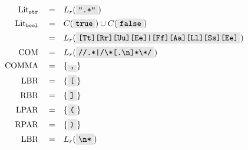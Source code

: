 \documentclass{article}
\newcommand{\code}[1]{\colorbox{gray!20}{\texttt{#1}}}
\begin{document}
\begin{multicols}{2}
\begin{align}
    \mathrm{Lit}_{\mathtt{str}}\quad =&\quad L_r( \code{".*"}) \\
    \mathrm{Lit}_{\mathtt{bool}} \quad =&\quad C(\code{true}) \cup C(\code{false})  \\
    =& \quad L_r(\code{[Tt][Rr][Uu][Ee]|[Ff][Aa][Ll][Ss][Ee]}) \nonumber \\
    \mathrm{COM} \quad =&\quad L_r(\code{//.*|/\textbackslash*[.\textbackslash n]*\textbackslash*/})\\
    \mathrm{COMMA} \quad =&\quad \{\code,\} \\
    \mathrm{LBR} \quad =&\quad \{\code[\} \\
    \mathrm{RBR} \quad =&\quad \{\code]\} \\
    \mathrm{LPAR} \quad =&\quad \{\code(\} \\
    \mathrm{RPAR} \quad =&\quad \{\code)\} \\
	\mathrm{LBR} \quad =&\quad L_r(\code{\textbackslash n*}) \\
\end{align}
\end{multicols}
\end{document}
